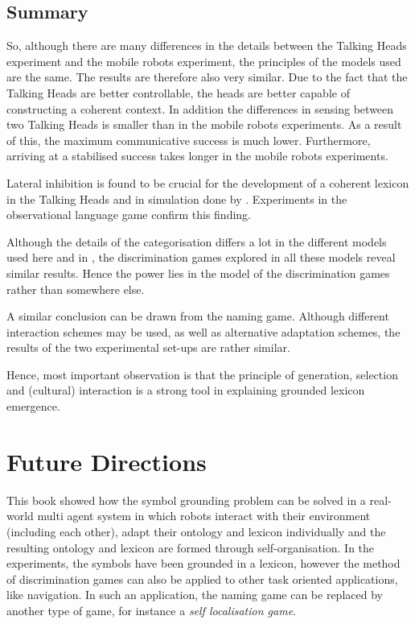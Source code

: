 \subsection{Summary}

So, although there are many differences in the details between the Talking Heads experiment and the mobile robots experiment, the principles of the models used are the same. The results are therefore also very similar. Due to the fact that the Talking Heads are better controllable, the heads are better capable of constructing a coherent context. In addition the differences in sensing between two Talking Heads is smaller than in the mobile robots experiments. As a result of this, the maximum communicative success is much lower. Furthermore, arriving at a stabilised success takes longer in the mobile robots experiments. 

Lateral inhibition is found to be crucial for the development of a coherent lexicon in the Talking Heads \citep{steels:2000,kaplan:2000} and in simulation done by \citet{dejong:2000}. Experiments in the observational language game confirm this finding. 

Although the details of the categorisation differs a lot in the different models used here and in \citep{steels:2000,dejong:2000}, the discrimination games explored in all these models reveal similar results. Hence the power lies in the model of the discrimination games rather than somewhere else.

A similar conclusion can be drawn from the naming game. Although different interaction schemes may be used, as well as alternative adaptation schemes, the results of the two experimental set-ups are rather similar. 

Hence, most important observation is that the principle of generation, selection and (cultural) interaction is a strong tool in explaining grounded lexicon emergence.

\section{Future Directions}

This book showed how the symbol grounding problem can be solved in a real-world multi agent system in which robots interact with their environment (including each other), adapt their ontology and lexicon individually and the resulting ontology and lexicon are formed through self-organisation. In the experiments, the symbols have been grounded in a lexicon, however the method of discrimination games can also be applied to other task oriented applications, like navigation. In such an application, the naming game can be replaced by another type of game, for instance a {\em self localisation game}.

